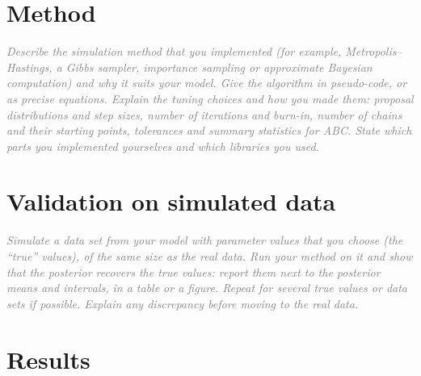 \documentclass[12pt]{article}
\newcommand{\guide}[1]{\textit{\textcolor{gray}{#1}}}
\begin{document}
\section{Method}\label{sec:method}

\guide{Describe the simulation method that you implemented (for example, Metropolis--Hastings, a Gibbs sampler, importance sampling or approximate Bayesian computation) and why it suits your model. Give the algorithm in pseudo-code, or as precise equations. Explain the tuning choices and how you made them: proposal distributions and step sizes, number of iterations and burn-in, number of chains and their starting points, tolerances and summary statistics for ABC. State which parts you implemented yourselves and which libraries you used.}

\section{Validation on simulated data}\label{sec:validation}

\guide{Simulate a data set from your model with parameter values that you choose (the ``true'' values), of the same size as the real data. Run your method on it and show that the posterior recovers the true values: report them next to the posterior means and intervals, in a table or a figure. Repeat for several true values or data sets if possible. Explain any discrepancy before moving to the real data.}

\section{Results}\label{sec:results}
\end{document}
